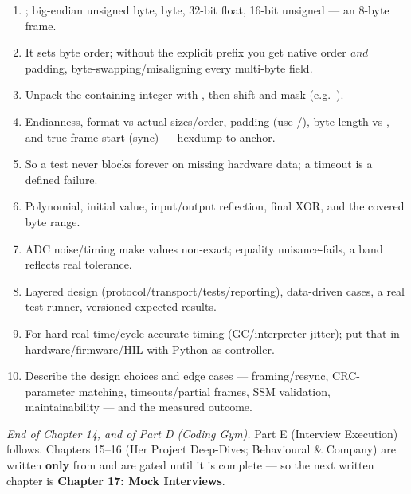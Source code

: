 \begin{answerkey}
\begin{enumerate}
\item {}; big-endian unsigned byte, byte, 32-bit float, 16-bit
  unsigned --- an 8-byte frame.
\item It sets byte order; without the explicit prefix you get native order
  \emph{and} padding, byte-swapping/misaligning every multi-byte field.
\item Unpack the containing integer with , then shift and mask
  (e.g.\ ).
\item Endianness, format vs actual sizes/order, padding (use \code{>}/\code{<}),
  byte length vs , and true frame start (sync) --- hexdump to
  anchor.
\item So a test never blocks forever on missing hardware data; a timeout is a
  defined failure.
\item Polynomial, initial value, input/output reflection, final XOR, and the
  covered byte range.
\item ADC noise/timing make values non-exact; equality nuisance-fails, a band
  reflects real tolerance.
\item Layered design (protocol/transport/tests/reporting), data-driven cases, a
  real test runner, versioned expected results.
\item For hard-real-time/cycle-accurate timing (GC/interpreter jitter); put that
  in hardware/firmware/HIL with Python as controller.
\item Describe the design choices and edge cases --- framing/resync, CRC-parameter
  matching, timeouts/partial frames, SSM validation, maintainability --- and the
  measured outcome.
\end{enumerate}
\end{answerkey}

\begin{partnote}
\emph{End of Chapter 14, and of Part D (Coding Gym).} Part E (Interview
Execution) follows. Chapters 15--16 (Her Project Deep-Dives; Behavioural \&
Company) are written \textbf{only} from  and are gated
until it is complete --- so the next written chapter is \textbf{Chapter 17: Mock
Interviews}.
\end{partnote}
